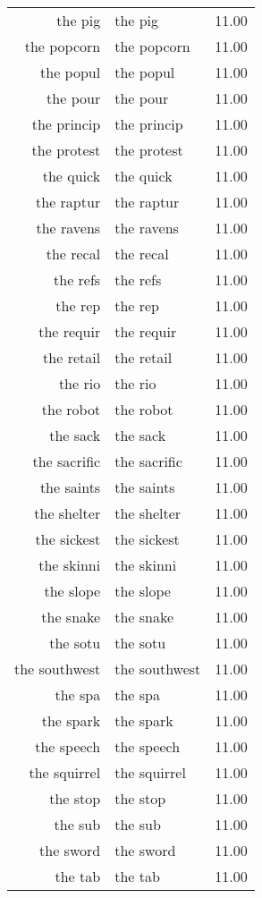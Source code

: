 \begin{table}[ht]
\begin{tabular}{rlr}
  the pig & the pig & 11.00 \\ 
  the popcorn & the popcorn & 11.00 \\ 
  the popul & the popul & 11.00 \\ 
  the pour & the pour & 11.00 \\ 
  the princip & the princip & 11.00 \\ 
  the protest & the protest & 11.00 \\ 
  the quick & the quick & 11.00 \\ 
  the raptur & the raptur & 11.00 \\ 
  the ravens & the ravens & 11.00 \\ 
  the recal & the recal & 11.00 \\ 
  the refs & the refs & 11.00 \\ 
  the rep & the rep & 11.00 \\ 
  the requir & the requir & 11.00 \\ 
  the retail & the retail & 11.00 \\ 
  the rio & the rio & 11.00 \\ 
  the robot & the robot & 11.00 \\ 
  the sack & the sack & 11.00 \\ 
  the sacrific & the sacrific & 11.00 \\ 
  the saints & the saints & 11.00 \\ 
  the shelter & the shelter & 11.00 \\ 
  the sickest & the sickest & 11.00 \\ 
  the skinni & the skinni & 11.00 \\ 
  the slope & the slope & 11.00 \\ 
  the snake & the snake & 11.00 \\ 
  the sotu & the sotu & 11.00 \\ 
  the southwest & the southwest & 11.00 \\ 
  the spa & the spa & 11.00 \\ 
  the spark & the spark & 11.00 \\ 
  the speech & the speech & 11.00 \\ 
  the squirrel & the squirrel & 11.00 \\ 
  the stop & the stop & 11.00 \\ 
  the sub & the sub & 11.00 \\ 
  the sword & the sword & 11.00 \\ 
  the tab & the tab & 11.00 \\ 

\end{tabular}
\end{table}
